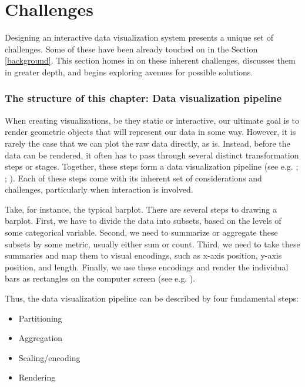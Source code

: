 \documentclass[
  openany]{book}
\providecommand{\tightlist}{%
  \setlength{\itemsep}{0pt}\setlength{\parskip}{0pt}}
\theoremstyle{definition}
\theoremstyle{definition}
\theoremstyle{definition}
\theoremstyle{definition}
\theoremstyle{remark}
\begin{document}
\newcommand\thena{;}

\chapter{Challenges}\label{problems}

Designing an interactive data visualization system presents a unique set of challenges. Some of these have been already touched on in the Section \ref{background}. This section homes in on these inherent challenges, discusses them in greater depth, and begins exploring avenues for possible solutions.

\subsection{The structure of this chapter: Data visualization pipeline}\label{the-structure-of-this-chapter-data-visualization-pipeline}

When creating visualizations, be they static or interactive, our ultimate goal is to render geometric objects that will represent our data in some way. However, it is rarely the case that we can plot the raw data directly, as is. Instead, before the data can be rendered, it often has to pass through several distinct transformation steps or stages. Together, these steps form a data visualization pipeline (see e.g. ; ; ). Each of these steps come with its inherent set of considerations and challenges, particularly when interaction is involved.

Take, for instance, the typical barplot. There are several steps to drawing a barplot. First, we have to divide the data into subsets, based on the levels of some categorical variable. Second, we need to summarize or aggregate these subsets by some metric, usually either sum or count. Third, we need to take these summaries and map them to visual encodings, such as x-axis position, y-axis position, and length. Finally, we use these encodings and render the individual bars as rectangles on the computer screen (see e.g. ).

Thus, the data visualization pipeline can be described by four fundamental steps:

\begin{itemize}
\tightlist
\item
  Partitioning
\item
  Aggregation
\item
  Scaling/encoding
\item
  Rendering
\end{itemize}
\end{document}
